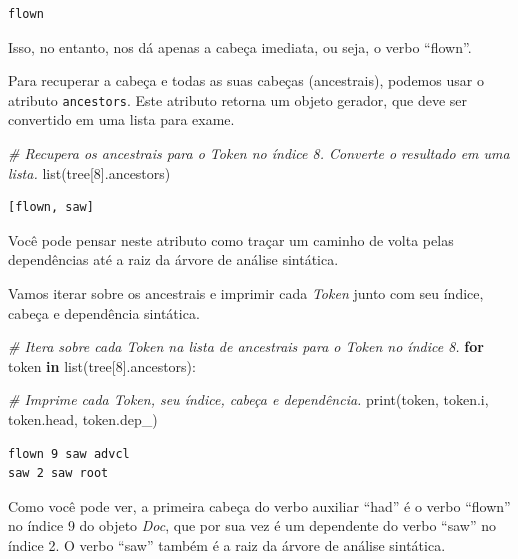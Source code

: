 \documentclass[
  brazilian,
]{article}
\newenvironment{Shaded}{}{}
\newcommand{\BuiltInTok}[1]{#1}
\newcommand{\CommentTok}[1]{\textcolor[rgb]{0.38,0.63,0.69}{\textit{#1}}}
\newcommand{\ControlFlowTok}[1]{\textcolor[rgb]{0.00,0.44,0.13}{\textbf{#1}}}
\newcommand{\DecValTok}[1]{\textcolor[rgb]{0.25,0.63,0.44}{#1}}
\newcommand{\KeywordTok}[1]{\textcolor[rgb]{0.00,0.44,0.13}{\textbf{#1}}}
\newcommand{\NormalTok}[1]{#1}
\begin{document}
\begin{verbatim}
flown
\end{verbatim}

Isso, no entanto, nos dá apenas a cabeça imediata, ou seja, o verbo
``flown''.

Para recuperar a cabeça e todas as suas cabeças (ancestrais), podemos
usar o atributo \texttt{ancestors}. Este atributo retorna um objeto
gerador, que deve ser convertido em uma lista para exame.

\begin{Shaded}
\begin{Highlighting}[]
\CommentTok{\# Recupera os ancestrais para o Token no índice 8. Converte o resultado em uma lista.}
\BuiltInTok{list}\NormalTok{(tree[}\DecValTok{8}\NormalTok{].ancestors)}
\end{Highlighting}
\end{Shaded}

\begin{verbatim}
[flown, saw]
\end{verbatim}

Você pode pensar neste atributo como traçar um caminho de volta pelas
dependências até a raiz da árvore de análise sintática.

Vamos iterar sobre os ancestrais e imprimir cada \emph{Token} junto com
seu índice, cabeça e dependência sintática.

\begin{Shaded}
\begin{Highlighting}[]
\CommentTok{\# Itera sobre cada Token na lista de ancestrais para o Token no índice 8.}
\ControlFlowTok{for}\NormalTok{ token }\KeywordTok{in} \BuiltInTok{list}\NormalTok{(tree[}\DecValTok{8}\NormalTok{].ancestors):}
    
    \CommentTok{\# Imprime cada Token, seu índice, cabeça e dependência.}
    \BuiltInTok{print}\NormalTok{(token, token.i, token.head, token.dep\_)}
\end{Highlighting}
\end{Shaded}

\begin{verbatim}
flown 9 saw advcl
saw 2 saw root
\end{verbatim}

Como você pode ver, a primeira cabeça do verbo auxiliar ``had'' é o
verbo ``flown'' no índice 9 do objeto \emph{Doc}, que por sua vez é um
dependente do verbo ``saw'' no índice 2. O verbo ``saw'' também é a raiz
da árvore de análise sintática.
\end{document}
